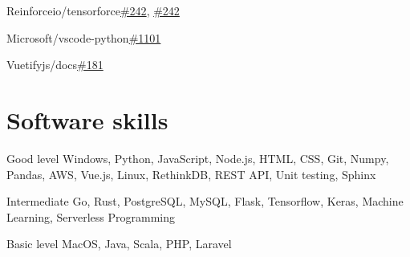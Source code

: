\documentclass{tccv}
\begin{document}
\begin{factlist}
\item{Reinforceio/tensorforce}{\href{https://github.com/reinforceio/tensorforce/pull/242}{\#242}, \href{https://github.com/reinforceio/tensorforce/pull/244}{\#242}}
\item{Microsoft/vscode-python}{\href{https://github.com/DonJayamanne/pythonVSCode/issues/1101}{\#1101}}
\item{Vuetifyjs/docs}{\href{https://github.com/vuetifyjs/docs/pull/181}{\#181}}
\end{factlist}

\section{Software skills}

\begin{factlist}

\item{Good level}
     {Windows, Python, JavaScript, Node.js, HTML, CSS, Git, Numpy, Pandas, AWS, Vue.js, Linux, RethinkDB, REST API, Unit testing, Sphinx}

\item{Intermediate}
     {Go, Rust, PostgreSQL, MySQL, Flask, Tensorflow, Keras, Machine Learning, Serverless Programming}

\item{Basic level}
     {MacOS, Java, Scala, PHP, Laravel}

\end{factlist}
\end{document}

